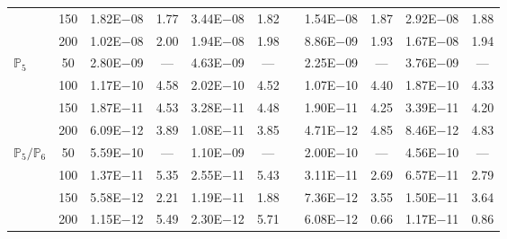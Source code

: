 \begin{table}[H]
{\begin{tabular}{@{}l c c c c c c c c c c@{}}
 & 150 & 1.82E$-$08 & 1.77  & 3.44E$-$08 & 1.82 &  & 1.54E$-$08 & 1.87 & 2.92E$-$08 & 1.88\\
 & 200 & 1.02E$-$08 & 2.00  & 1.94E$-$08 & 1.98 &  & 8.86E$-$09 & 1.93 & 1.67E$-$08 & 1.94\\
\midrule
\multirow{4}{*}{$\mathbb{P}_{5}$}
 & 50 & 2.80E$-$09 & ---  & 4.63E$-$09 & --- &  & 2.25E$-$09 & --- & 3.76E$-$09 & ---\\
 & 100 & 1.17E$-$10 & 4.58  & 2.02E$-$10 & 4.52 &  & 1.07E$-$10 & 4.40 & 1.87E$-$10 & 4.33\\
 & 150 & 1.87E$-$11 & 4.53  & 3.28E$-$11 & 4.48 &  & 1.90E$-$11 & 4.25 & 3.39E$-$11 & 4.20\\
 & 200 & 6.09E$-$12 & 3.89  & 1.08E$-$11 & 3.85 &  & 4.71E$-$12 & 4.85 & 8.46E$-$12 & 4.83\\
\midrule
\multirow{4}{*}{$\mathbb{P}_{5}/\mathbb{P}_{6}$}
 & 50 & 5.59E$-$10 & ---  & 1.10E$-$09 & --- &  & 2.00E$-$10 & --- & 4.56E$-$10 & ---\\
 & 100 & 1.37E$-$11 & 5.35  & 2.55E$-$11 & 5.43 &  & 3.11E$-$11 & 2.69 & 6.57E$-$11 & 2.79\\
 & 150 & 5.58E$-$12 & 2.21  & 1.19E$-$11 & 1.88 &  & 7.36E$-$12 & 3.55 & 1.50E$-$11 & 3.64\\
 & 200 & 1.15E$-$12 & 5.49  & 2.30E$-$12 & 5.71 &  & 6.08E$-$12 & 0.66 & 1.17E$-$11 & 0.86\\
\bottomrule
\end{tabular}}
\label{none}
\end{table}
